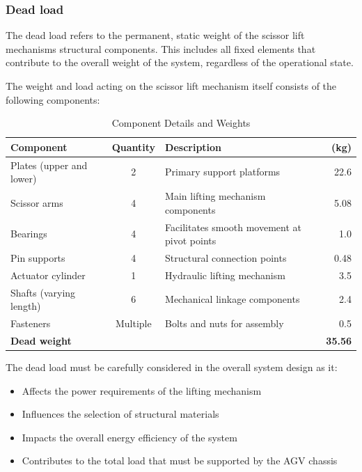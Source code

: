 \documentclass[../../main]{subfiles}
\begin{document}
\subsubsection{Dead load}

The dead load refers to the permanent, static weight of the scissor lift
mechanism\textquotesingle s structural components. This includes all
fixed elements that contribute to the overall weight of the system,
regardless of the operational state.

The weight and load acting on the scissor lift mechanism itself consists
of the following components:

\begin{table}[h!]
  \centering
  \begin{tcolorbox}[
    colback=red!5!white,colframe=red!75!black,
    title={\textbf{Component Details and Weights}},
    fonttitle=\bfseries, coltitle=white, width=\linewidth
]
  \begin{tabular}{|l|c|p{6cm}|r|}
    \hline \rowcolor{red!20}
    \textbf{Component} & \textbf{Quantity} & \textbf{Description} & \textbf{(kg)} \\ \hline
    Plates (upper and lower) & 2 & Primary support platforms & 22.6 \\ \hline
    Scissor arms & 4 & Main lifting mechanism components & 5.08 \\ \hline
    Bearings & 4 & Facilitates smooth movement at pivot points & 1.0 \\ \hline
    Pin supports & 4 & Structural connection points & 0.48 \\ \hline
    Actuator cylinder & 1 & Hydraulic lifting mechanism & 3.5 \\ \hline
    Shafts (varying length) & 6 & Mechanical linkage components & 2.4 \\ \hline
    Fasteners & Multiple & Bolts and nuts for assembly & 0.5 \\ \hline
    \multicolumn{3}{|l|}{\textbf{Dead weight}} & \textbf{35.56} \\ \hline
  \end{tabular}
\end{tcolorbox}
\caption{Component Details and Weights}
  \end{table}


The dead load must be carefully considered in the overall system design
as it:

\begin{itemize}
\item
  Affects the power requirements of the lifting mechanism
\item
  Influences the selection of structural materials
\item
  Impacts the overall energy efficiency of the system
\item
  Contributes to the total load that must be supported by the AGV
  chassis
\end{itemize}
\newpage
\end{document}
